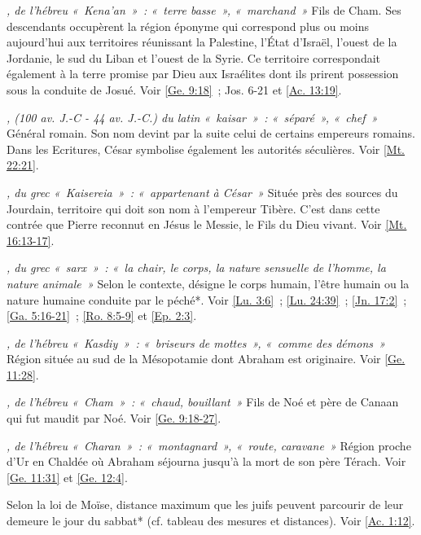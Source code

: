 \begin{multicols}{2}
\textit{, de l'hébreu «~Kena'an~»~: «~terre basse~», «~marchand~»}\newline
Fils de Cham. Ses descendants occupèrent la région éponyme qui correspond plus ou moins aujourd'hui aux territoires réunissant la Palestine, l'État d'Israël, l'ouest de la Jordanie, le sud du Liban et l'ouest de la Syrie. Ce territoire correspondait également à la terre promise par Dieu aux Israélites dont ils prirent possession sous la conduite de Josué. Voir \vref{Ge. 9:18}~; Jos. 6-21 et \vref{Ac. 13:19}.

\textit{, (100 av. J.-C - 44 av. J.-C.) du latin «~kaisar~»~: «~séparé~», «~chef~»}\newline
Général romain. Son nom devint par la suite celui de certains empereurs romains. Dans les Ecritures, César symbolise également les autorités séculières. Voir \vref{Mt. 22:21}.

\textit{, du grec «~Kaisereia~»~: «~appartenant à César~»}\newline
Située près des sources du Jourdain, territoire qui doit son nom à l'empereur Tibère. C'est dans cette contrée que Pierre reconnut en Jésus le Messie, le Fils du Dieu vivant. Voir \vref{Mt. 16:13-17}.

\textit{, du grec «~sarx~»~: «~la chair, le corps, la nature sensuelle de l'homme, la nature animale~»}\newline
Selon le contexte, désigne le corps humain, l'être humain ou la nature humaine conduite par le péché*. Voir \vref{Lu. 3:6}~; \vref{Lu. 24:39}~; \vref{Jn. 17:2}~; \vref{Ga. 5:16-21}~; \vref{Ro. 8:5-9} et \vref{Ep. 2:3}.

\textit{, de l'hébreu «~Kasdiy~»~: «~briseurs de mottes~», «~comme des démons~»}\newline
Région située au sud de la Mésopotamie dont Abraham est originaire. Voir \vref{Ge. 11:28}.

\textit{, de l'hébreu «~Cham~»~: «~chaud, bouillant~»}\newline
Fils de Noé et père de Canaan qui fut maudit par Noé. Voir \vref{Ge. 9:18-27}.

\textit{, de l'hébreu «~Charan~»~: «~montagnard~», «~route, caravane~»}\newline
Région proche d'Ur en Chaldée où Abraham séjourna jusqu'à la mort de son père Térach. Voir \vref{Ge. 11:31} et \vref{Ge. 12:4}.

\textit{}\newline
Selon la loi de Moïse, distance maximum que les juifs peuvent parcourir de leur demeure le jour du sabbat* (cf. tableau des mesures et distances). Voir \vref{Ac. 1:12}.


\end{multicols}
